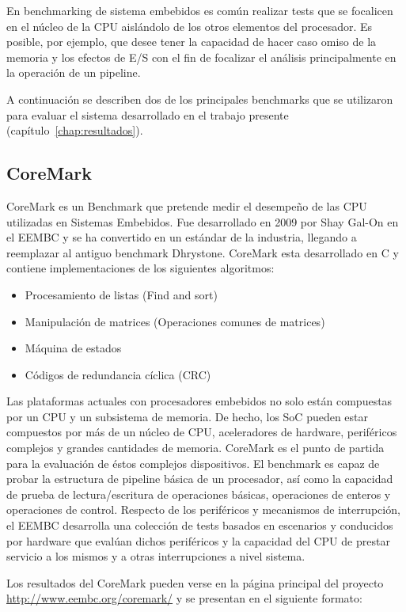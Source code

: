 En benchmarking de sistema embebidos es común realizar tests que se
focalicen en el núcleo de la CPU aislándolo de los otros elementos del
procesador. Es posible, por ejemplo, que desee tener la capacidad de
hacer caso omiso de la memoria y los efectos de E/S con el fin de
focalizar el análisis principalmente en la operación de un pipeline.

A continuación se describen dos de los principales benchmarks que se
utilizaron para evaluar el sistema desarrollado en el trabajo presente
(capítulo~\ref {chap:resultados}).

\subsection{CoreMark}	

CoreMark es un Benchmark que pretende medir el desempeño de las CPU
utilizadas en Sistemas Embebidos. Fue desarrollado en 2009 por Shay
Gal-On en el EEMBC y se ha convertido en un estándar de la
industria, llegando a reemplazar al antiguo benchmark
Dhrystone. CoreMark esta desarrollado en C y contiene implementaciones
de los siguientes algoritmos:
	
\begin{itemize}
\item Procesamiento de listas (Find and sort)
\item Manipulación de matrices (Operaciones comunes de matrices)
\item Máquina de estados 
\item Códigos de redundancia cíclica (CRC)  
\end{itemize}	 
	
Las plataformas actuales con procesadores embebidos no solo están
compuestas por un CPU y un subsistema de memoria. De hecho, los SoC
pueden estar compuestos por más de un núcleo de CPU, aceleradores de
hardware, periféricos complejos y grandes cantidades de
memoria. CoreMark es el punto de partida para la evaluación de éstos
complejos dispositivos. El benchmark es capaz de probar la estructura
de pipeline básica de un procesador, así como la capacidad de prueba
de lectura/escritura de operaciones básicas, operaciones de enteros y
operaciones de control. Respecto de los periféricos y mecanismos de
interrupción, el EEMBC desarrolla una colección de tests basados en
escenarios y conducidos por hardware que evalúan dichos periféricos
y la capacidad del CPU de prestar servicio a los mismos y a otras
interrupciones a nivel sistema.
	
Los resultados del CoreMark pueden verse en la página principal   
del proyecto \url{http://www.eembc.org/coremark/} y se presentan en el siguiente formato:
	
